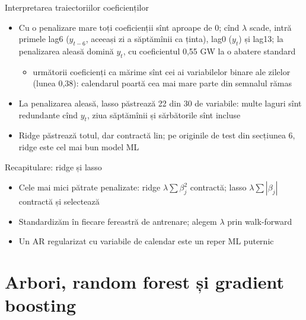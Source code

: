 \begin{frame}{Interpretarea traiectoriilor coeficienților}
\itemsize{\small}
\begin{itemize}
    \item Cu o penalizare mare toți coeficienții sînt aproape de 0; cînd $\lambda$ scade, intră primele lag6 ($y_{t-6}$, aceeași zi a săptămînii ca ținta), lag0 ($y_t$) și lag13; la penalizarea aleasă domină $y_t$, cu coeficientul 0{,}55 GW la o abatere standard
    \begin{itemize}
        \item următorii coeficienți ca mărime sînt cei ai variabilelor binare ale zilelor (lunea 0{,}38): calendarul poartă cea mai mare parte din semnalul rămas
    \end{itemize}
    \item La penalizarea aleasă, lasso păstrează 22 din 30 de variabile: multe laguri sînt redundante cînd $y_t$, ziua săptămînii și sărbătorile sînt incluse
    \item Ridge păstrează totul, dar contractă lin; pe originile de test din secțiunea 6, ridge este cel mai bun model ML
\end{itemize}
\end{frame}

\begin{frame}{Recapitulare: ridge și lasso}
\itemsize{\small}
\begin{itemize}
    \item Cele mai mici pătrate penalizate: ridge $\lambda\sum\beta_j^2$ contractă; lasso $\lambda\sum|\beta_j|$ contractă și selectează
    \item Standardizăm în fiecare fereastră de antrenare; alegem $\lambda$ prin walk-forward
    \item Un AR regularizat cu variabile de calendar este un reper ML puternic
\end{itemize}
\end{frame}


\section{Arbori, random forest și gradient boosting}

